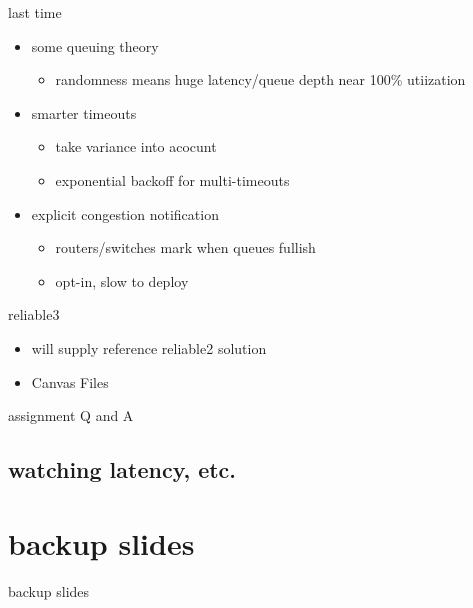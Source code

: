 \date{}
\title{}
\date{}
\usepackage{pgfplots}
\pgfplotsset{compat=1.16}

\begin{frame}
    \titlepage
\end{frame}

\begin{frame}{last time}
    \begin{itemize}
    \item some queuing theory
        \begin{itemize}
        \item randomness means huge latency/queue depth near 100\% utiization
        \end{itemize}
    \item smarter timeouts
        \begin{itemize}
        \item take variance into acocunt
        \item exponential backoff for multi-timeouts
        \end{itemize}
    \item explicit congestion notification
        \begin{itemize}
        \item routers/switches mark when queues fullish
        \item opt-in, slow to deploy
        \end{itemize}
    \end{itemize}
\end{frame}

\begin{frame}{reliable3}
    \begin{itemize}
    \item will supply reference reliable2 solution
    \item Canvas Files
    \end{itemize}
\end{frame}

\begin{frame}{assignment Q and A}
\end{frame}

\subsection{watching latency, etc.}








\section{backup slides}
\begin{frame}{backup slides}
\end{frame}


